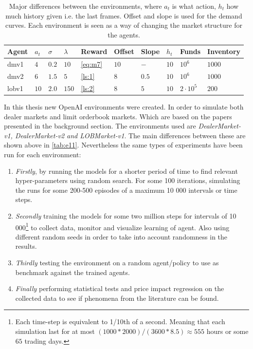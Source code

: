 \documentclass{kththesis}
\theoremstyle{definition}
\begin{document}
\begin{table}[H]
\centering
\caption{Major differences between the environments, where $a_t$ is what action, $h_t$ how much history given i.e. the last frames. Offset and slope is used for the demand curves. Each environment is seen as a way of changing the market structure for the agents.}
\label{tab:e11}
\begin{tabular}{llllllllll}
Agent & $a_t$  & $\sigma$  & $\lambda$  & Reward  & Offset  & Slope  & $h_t$  & Funds & Inventory  \\ \hline
 dmv1 & $4$  & $0.2$  & $10$  & \autoref{eq:m7}  & $10$  & $-$  &  $10$ & $10^6$ & $1000$ \\
 dmv2 & $6$  & $1.5$  & $5$  & \autoref{ls:1}  & $8$  & $0.5$  & $10$  & $10^6$ & $1000$ \\
 lobv1& $10$ & $2.0$  & $150$  & \autoref{ls:2} & $8$  & $5$  & $10$  & $2\cdot 10^5$ & $200$
\end{tabular}
\end{table}

In this thesis new OpenAI environments were created. In order to simulate both dealer markets and limit orderbook markets. Which are based on the papers presented in the background section. 
\newline
\newline
The environments used are \textit{ DealerMarket-v1, DealerMarket-v2 and LOBMarket-v1}. The main differences between these are shown above in \autoref{tab:e11}.
Nevertheless the same types of experiments have been run for each environment:

\begin{enumerate}
    \item \textit{Firstly}, by running the models for a shorter period of time to find relevant hyper-parameters using random search. For some 100 iterations, simulating the runs for some 200-500 episodes of a maximum 10 000 intervals or time steps.
    
    \item \textit{Secondly} training the models for some two million steps for intervals of 10 000\footnote{Each time-step is equivalent to 1/10th of a second. Meaning that each simulation last for at most $ (1000*2000)/(3600 * 8.5) \approx 555$ hours or some $65$ trading days.} to collect data, monitor and visualize learning of agent. Also using different random seeds in order to take into account randomness in the results. 
    
    \item\textit{Thirdly} testing the environment on a random agent/policy to use as benchmark against the trained agents.
    
    \item   \textit{Finally} performing statistical tests and price impact regression on the collected data to see if phenomena from the literature can be found.
\end{enumerate}
\end{document}
